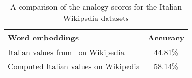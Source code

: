 
\begin{table}
  \begin{tabularx}{\textwidth}{Xc}
    \toprule
    \textbf{Word embeddings}& \textbf{Accuracy} \\
    \midrule
    Italian values from~\cite{berardi2015word} on Wikipedia & 44.81\% \\
    Computed Italian values on Wikipedia & 58.14\% \\
    \bottomrule
  \end{tabularx}
  \caption{A comparison of the analogy scores for the Italian Wikipedia datasets}\label{tab:italianEmbeddingsAnalogy}
\end{table}
